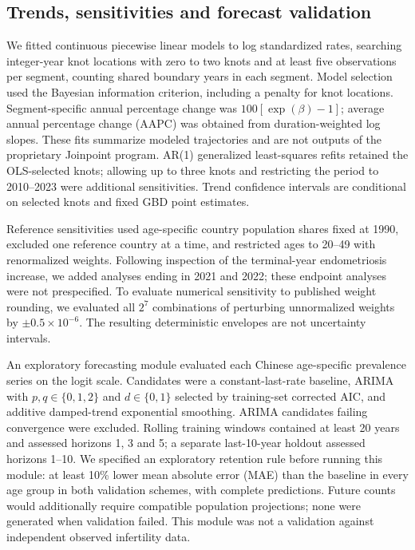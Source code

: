 \documentclass[11pt,a4paper]{article}
\begin{document}
\subsection{Trends, sensitivities and forecast validation}
We fitted continuous piecewise linear models to log standardized rates, searching integer-year knot locations with zero to two knots and at least five observations per segment, counting shared boundary years in each segment. Model selection used the Bayesian information criterion, including a penalty for knot locations. Segment-specific annual percentage change was $100[\exp(\beta)-1]$; average annual percentage change (AAPC) was obtained from duration-weighted log slopes. These fits summarize modeled trajectories and are not outputs of the proprietary Joinpoint program. AR(1) generalized least-squares refits retained the OLS-selected knots; allowing up to three knots and restricting the period to 2010--2023 were additional sensitivities. Trend confidence intervals are conditional on selected knots and fixed GBD point estimates.

Reference sensitivities used age-specific country population shares fixed at 1990, excluded one reference country at a time, and restricted ages to 20--49 with renormalized weights. Following inspection of the terminal-year endometriosis increase, we added analyses ending in 2021 and 2022; these endpoint analyses were not prespecified. To evaluate numerical sensitivity to published weight rounding, we evaluated all $2^7$ combinations of perturbing unnormalized weights by $\pm0.5\times10^{-6}$. The resulting deterministic envelopes are not uncertainty intervals.

An exploratory forecasting module evaluated each Chinese age-specific prevalence series on the logit scale. Candidates were a constant-last-rate baseline, ARIMA with $p,q\in\{0,1,2\}$ and $d\in\{0,1\}$ selected by training-set corrected AIC, and additive damped-trend exponential smoothing. ARIMA candidates failing convergence were excluded. Rolling training windows contained at least 20 years and assessed horizons 1, 3 and 5; a separate last-10-year holdout assessed horizons 1--10. We specified an exploratory retention rule before running this module: at least 10\% lower mean absolute error (MAE) than the baseline in every age group in both validation schemes, with complete predictions. Future counts would additionally require compatible population projections; none were generated when validation failed. This module was not a validation against independent observed infertility data.
\end{document}
